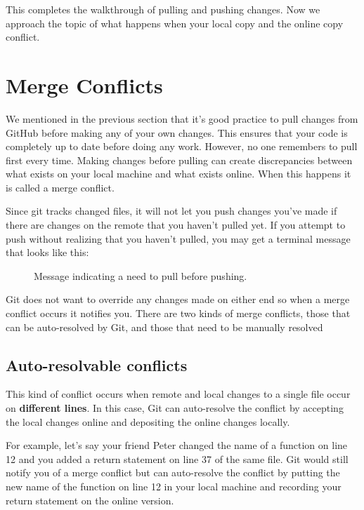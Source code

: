 This completes the walkthrough of pulling and pushing changes. Now we approach the topic of what happens when your local copy and the online copy conflict.

\section{Merge Conflicts}

We mentioned in the previous section that it's good practice to pull changes from GitHub before making any of your own changes. This ensures that your code is
completely up to date before doing any work. However, no one remembers to pull first every time. Making changes before pulling can create discrepancies between what 
exists on your local machine and what exists online. When this happens it is called a merge conflict.

Since git tracks changed files, it will not let you push changes you've made if there are changes on the remote that you haven't pulled yet. If you attempt to push
without realizing that you haven't pulled, you may get a terminal message that looks like this:


\begin{figure}[h]
    \centering
    \caption{Message indicating a need to pull before pushing.}
    \label{fig:cannot push}
\end{figure}

Git does not want to override any changes made on either end so when a merge conflict occurs it notifies you. 
There are two kinds of merge conflicts, those that can be auto-resolved
by Git, and those that need to be manually resolved

\subsection{Auto-resolvable conflicts}

This kind of conflict occurs when remote and local changes to a single file occur on \textbf{different lines}. In this case, Git can auto-resolve the
conflict by accepting the local changes online and depositing the online changes locally. 

For example, let's say your friend Peter changed the name of a function on line 12 and you added a return statement on line 37 of the same file. 
Git would still notify you of a merge conflict but can auto-resolve the conflict by putting the new name of the function on line 12 in your local machine
and recording your return statement on the online version.


